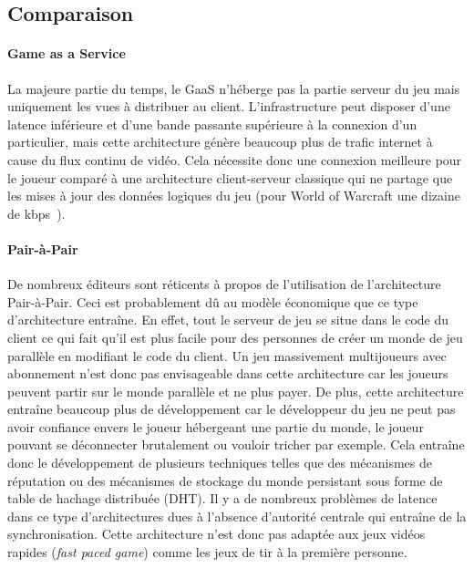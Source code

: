 \subsection{Comparaison}
\paragraph{Game as a Service\\}
La majeure partie du temps, le GaaS n'héberge pas la partie serveur du jeu mais uniquement les vues à distribuer au client.
L'infrastructure peut disposer d'une latence inférieure et d'une bande passante supérieure à la connexion d'un particulier, mais cette architecture génère beaucoup plus de trafic internet à cause du flux continu de vidéo.
Cela nécessite donc une connexion meilleure pour le joueur comparé à une architecture client-serveur classique qui ne partage que les mises à jour des données logiques du jeu (pour World of Warcraft une dizaine de kbps~\cite{mmorpg_network_performance_session_patterns_and_latency_requirements_analysis}).

\paragraph{Pair-à-Pair\\}
De nombreux éditeurs sont réticents à propos de l'utilisation de l'architecture Pair-à-Pair.
Ceci est probablement dû au modèle économique que ce type d'architecture entraîne.
En effet, tout le serveur de jeu se situe dans le code du client ce qui fait qu'il est plus facile pour des personnes de créer un monde de jeu parallèle en modifiant le code du client.
Un jeu massivement multijoueurs avec abonnement n'est donc pas envisageable dans cette architecture car les joueurs peuvent partir sur le monde parallèle et ne plus payer.
De plus, cette architecture entraîne beaucoup plus de développement car le développeur du jeu ne peut pas avoir confiance envers le joueur hébergeant une partie du monde, le joueur pouvant se déconnecter brutalement ou vouloir tricher par exemple.
Cela entraîne donc le développement de plusieurs techniques telles que des mécanismes de réputation ou des mécanismes de stockage du monde persistant sous forme de table de hachage distribuée (DHT).
Il y a de nombreux problèmes de latence dans ce type d'architectures dues à l'absence d'autorité centrale qui entraîne de la synchronisation.
Cette architecture n'est donc pas adaptée aux jeux vidéos rapides (\textit{fast paced game}) comme les jeux de tir à la première personne.

